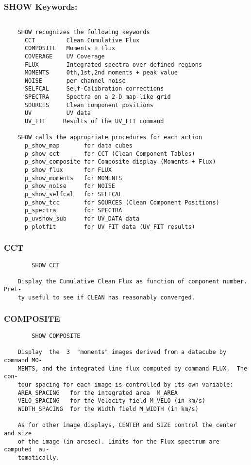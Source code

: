 \subsubsection{SHOW Keywords:}
\begin{verbatim}

    SHOW recognizes the following keywords
      CCT         Clean Cumulative Flux
      COMPOSITE   Moments + Flux
      COVERAGE    UV Coverage
      FLUX        Integrated spectra over defined regions
      MOMENTS     0th,1st,2nd moments + peak value
      NOISE       per channel noise
      SELFCAL     Self-Calibration corrections
      SPECTRA     Spectra on a 2-D map-like grid
      SOURCES     Clean component positions
      UV          UV data
      UV_FIT     Results of the UV_FIT command

    SHOW calls the appropriate procedures for each action
      p_show_map       for data cubes
      p_show_cct       for CCT (Clean Component Tables)
      p_show_composite for Composite display (Moments + Flux)
      p_show_flux      for FLUX
      p_show_moments   for MOMENTS
      p_show_noise     for NOISE
      p_show_selfcal   for SELFCAL
      p_show_tcc       for SOURCES (Clean Component Positions)
      p_spectra        for SPECTRA
      p_uvshow_sub     for UV_DATA data
      p_plotfit        for UV_FIT data (UV_FIT results)

\end{verbatim}
\subsubsection{CCT}
\begin{verbatim}
        SHOW CCT

    Display the Cumulative Clean Flux as function of component number. Pret-
    ty useful to see if CLEAN has reasonably converged.

\end{verbatim}
\subsubsection{COMPOSITE}
\begin{verbatim}
        SHOW COMPOSITE

    Display  the  3  "moments" images derived from a datacube by command MO-
    MENTS, and the integrated line flux computed by command FLUX.  The  con-
    tour spacing for each image is controlled by its own variable:
    AREA_SPACING   for the integrated area  M_AREA
    VELO_SPACING   for the Velocity field M_VELO (in km/s)
    WIDTH_SPACING  for the Width field M_WIDTH (in km/s)

    As for other image displays, CENTER and SIZE control the center and size
    of the image (in arcsec). Limits for the Flux spectrum are computed  au-
    tomatically.

\end{verbatim}
